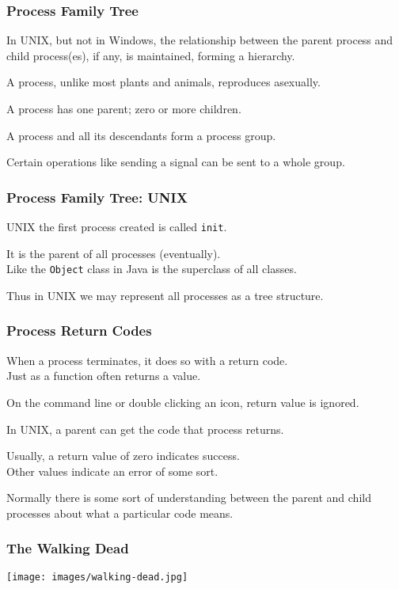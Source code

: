 \begin{frame}
	\frametitle{Process Family Tree}
	In UNIX, but not in Windows, the relationship between the parent process and child process(es), if any, is maintained, forming a hierarchy.

	A process, unlike most plants and animals, reproduces asexually.

	A process has one parent; zero or more children.

	A process and all its descendants form a \alert{process group}.

	Certain operations like sending a signal can be sent to a whole group.

\end{frame}

\begin{frame}
	\frametitle{Process Family Tree: UNIX}
	UNIX the first process created is called \texttt{init}.

	It is the parent of all processes (eventually).\\
	\quad Like the \texttt{Object} class in Java is the superclass of all classes.

	Thus in UNIX we may represent all processes as a tree structure.

\end{frame}

\begin{frame}
	\frametitle{Process Return Codes}

	When a process terminates, it does so with a return code.\\
	\quad  Just as a function often returns a value.

	On the command line or double clicking an icon, return value is ignored.

	In UNIX, a parent can get the code that process returns.

	Usually, a return value of zero indicates success.\\
	\quad Other values indicate an error of some sort.

	Normally there is some sort of understanding between the parent and child processes about what a particular code means.

\end{frame}


\begin{frame}
	\frametitle{The Walking Dead}

	\begin{center}
		\texttt{[image: images/walking-dead.jpg]}
	\end{center}

\end{frame}



